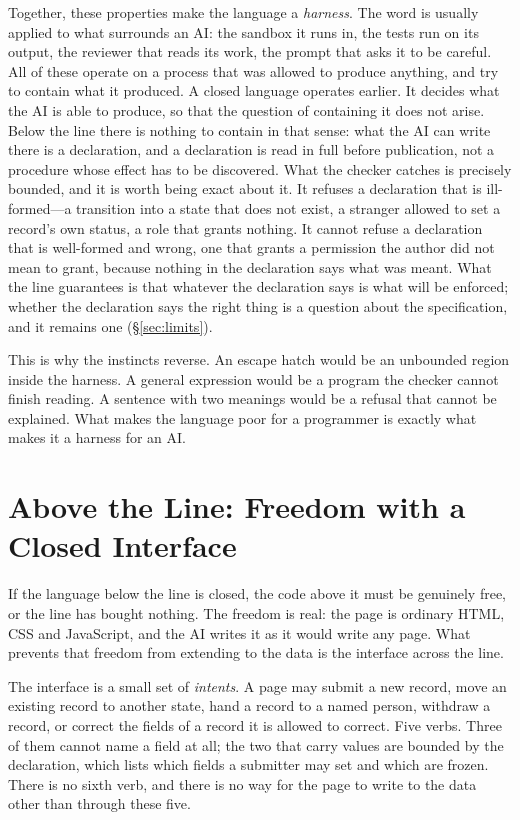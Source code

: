 \documentclass[11pt]{article}
\begin{document}
Together, these properties make the language a \emph{harness}. The word is usually applied to what surrounds an AI: the sandbox it runs in, the tests run on its output, the reviewer that reads its work, the prompt that asks it to be careful. All of these operate on a process that was allowed to produce anything, and try to contain what it produced. A closed language operates earlier. It decides what the AI is able to produce, so that the question of containing it does not arise. Below the line there is nothing to contain in that sense: what the AI can write there is a declaration, and a declaration is read in full before publication, not a procedure whose effect has to be discovered. What the checker catches is precisely bounded, and it is worth being exact about it. It refuses a declaration that is ill-formed---a transition into a state that does not exist, a stranger allowed to set a record's own status, a role that grants nothing. It cannot refuse a declaration that is well-formed and wrong, one that grants a permission the author did not mean to grant, because nothing in the declaration says what was meant. What the line guarantees is that whatever the declaration says is what will be enforced; whether the declaration says the right thing is a question about the specification, and it remains one (\S\ref{sec:limits}).

This is why the instincts reverse. An escape hatch would be an unbounded region inside the harness. A general expression would be a program the checker cannot finish reading. A sentence with two meanings would be a refusal that cannot be explained. What makes the language poor for a programmer is exactly what makes it a harness for an AI.

\section{Above the Line: Freedom with a Closed Interface}
\label{sec:above}

If the language below the line is closed, the code above it must be genuinely free, or the line has bought nothing. The freedom is real: the page is ordinary HTML, CSS and JavaScript, and the AI writes it as it would write any page. What prevents that freedom from extending to the data is the interface across the line.

The interface is a small set of \emph{intents}. A page may submit a new record, move an existing record to another state, hand a record to a named person, withdraw a record, or correct the fields of a record it is allowed to correct. Five verbs. Three of them cannot name a field at all; the two that carry values are bounded by the declaration, which lists which fields a submitter may set and which are frozen. There is no sixth verb, and there is no way for the page to write to the data other than through these five.
\end{document}
